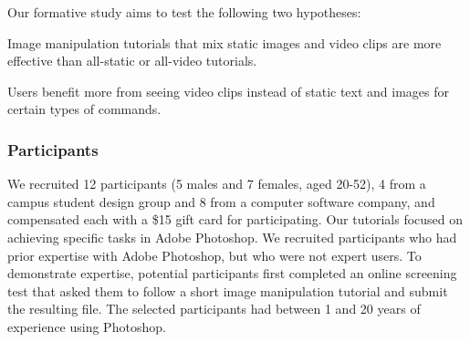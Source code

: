 Our formative study aims to test the following two hypotheses:

 Image manipulation tutorials that mix static images and video clips are more effective than all-static or all-video tutorials.

 Users benefit more from seeing video clips instead of static text and images for certain types of commands.

\subsubsection{Participants}
We recruited 12 participants (5 males and 7 females, aged 20-52), 4 from a campus student design group and 8 from a computer software company, and compensated each with a \$15 gift card for participating. Our tutorials focused on achieving specific tasks in Adobe Photoshop. We recruited participants who had prior expertise with Adobe Photoshop, but who were not expert users. To demonstrate expertise, potential participants first completed an online screening test that asked them to follow a short image manipulation tutorial and submit the resulting file. The selected participants had between 1 and 20 years of experience using Photoshop.

